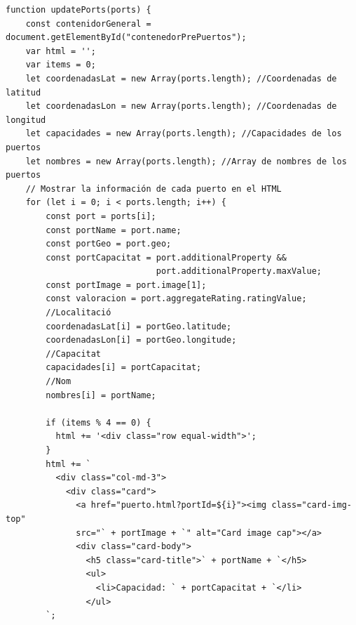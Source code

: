 \documentclass{article}
\begin{document}
\begin{itemize}
    \begin{verbatim}
function updatePorts(ports) {
    const contenidorGeneral = document.getElementById("contenedorPrePuertos");
    var html = '';
    var items = 0;
    let coordenadasLat = new Array(ports.length); //Coordenadas de latitud
    let coordenadasLon = new Array(ports.length); //Coordenadas de longitud
    let capacidades = new Array(ports.length); //Capacidades de los puertos
    let nombres = new Array(ports.length); //Array de nombres de los puertos
    // Mostrar la información de cada puerto en el HTML
    for (let i = 0; i < ports.length; i++) {
        const port = ports[i];
        const portName = port.name;
        const portGeo = port.geo;
        const portCapacitat = port.additionalProperty && 
                              port.additionalProperty.maxValue;
        const portImage = port.image[1];
        const valoracion = port.aggregateRating.ratingValue;
        //Localitació
        coordenadasLat[i] = portGeo.latitude;
        coordenadasLon[i] = portGeo.longitude;
        //Capacitat
        capacidades[i] = portCapacitat;
        //Nom
        nombres[i] = portName;

        if (items % 4 == 0) {
          html += '<div class="row equal-width">';
        }
        html += `
          <div class="col-md-3">
            <div class="card">
              <a href="puerto.html?portId=${i}"><img class="card-img-top" 
              src="` + portImage + `" alt="Card image cap"></a>
              <div class="card-body">
                <h5 class="card-title">` + portName + `</h5>
                <ul>
                  <li>Capacidad: ` + portCapacitat + `</li>
                </ul>
        `;
    

\end{verbatim}
\end{itemize}
\end{document}
